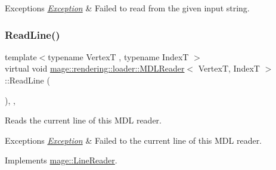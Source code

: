 \begin{DoxyExceptions}{Exceptions}
{\em \mbox{\hyperlink{classmage_1_1_exception}{Exception}}} & Failed to read from the given input string. \\
\hline
\end{DoxyExceptions}
\mbox{\label{classmage_1_1rendering_1_1loader_1_1_m_d_l_reader_a8b138830bd4ac4176b7a7444cdbdebfa}} 
\subsubsection{\texorpdfstring{Read\+Line()}{ReadLine()}}
{\footnotesize\ttfamily template$<$typename VertexT , typename IndexT $>$ \\
virtual void \mbox{\hyperlink{classmage_1_1rendering_1_1loader_1_1_m_d_l_reader}{mage\+::rendering\+::loader\+::\+M\+D\+L\+Reader}}$<$ VertexT, IndexT $>$\+::Read\+Line (\begin{DoxyParamCaption}{ }\end{DoxyParamCaption})\hspace{0.3cm}{\ttfamily [override]}, {\ttfamily [private]}, {\ttfamily [virtual]}}

Reads the current line of this M\+DL reader.


\begin{DoxyExceptions}{Exceptions}
{\em \mbox{\hyperlink{classmage_1_1_exception}{Exception}}} & Failed to the current line of this M\+DL reader. \\
\hline
\end{DoxyExceptions}


Implements \mbox{\hyperlink{classmage_1_1_line_reader_a8c81989a9d59ae31dd19e6d3961cfaf1}{mage\+::\+Line\+Reader}}.

\mbox{\label{classmage_1_1rendering_1_1loader_1_1_m_d_l_reader_a40697c5c645e00ba6f4cc5cd28872b8f}} 
